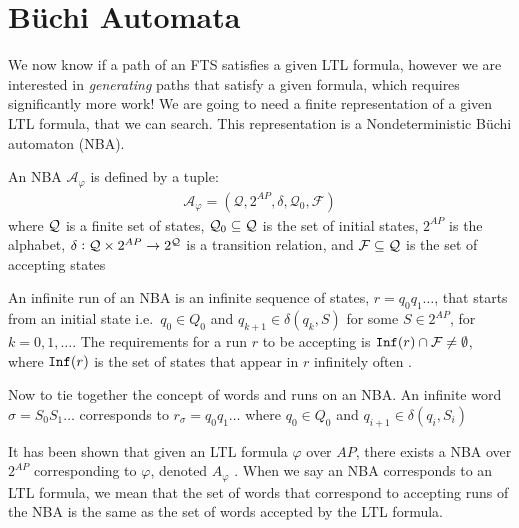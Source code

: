 \section{B\"{u}chi Automata}
We now know if a path of an FTS satisfies a given LTL formula, however we are interested in \textit{generating} paths that satisfy a given formula, which requires significantly more work! We are going to need a finite representation of a given LTL formula, that we can search. This representation is a Nondeterministic B\"{u}chi automaton (NBA). 
\begin{definition}
\label{defNBA}
An NBA $\mathcal{A}_\varphi$ is defined by a tuple:
\begin{align*}
\mathcal{A}_\varphi = (\mathcal{Q},2^{AP},\delta,\mathcal{Q}_0,\mathcal{F})
\end{align*}
where $\mathcal{Q}$ is a finite set of states, $\mathcal{Q}_0 \subseteq \mathcal{Q}$ is the set of initial states, $2^{AP}$ is the alphabet, $\delta: \mathcal{Q} \times 2^{AP} \rightarrow 2^{\mathcal{Q}}$ is a transition relation, and $\mathcal{F} \subseteq \mathcal{Q}$ is the set of accepting states
\end{definition} 
An infinite run of an NBA is an infinite sequence of states, $r=q_0 q_1 \dots$, that starts from an initial state i.e.\ $q_0 \in Q_0$ and $q_{k+1} \in \delta(q_k, S)$ for some $S \in 2^{AP}$, for $k = 0,1,\dots$. The requirements for a run $r$ to be accepting is $\texttt{Inf}(r) \cap \mathcal{F} \neq \emptyset$, where $\texttt{Inf}(r)$ is the set of states that appear in $r$ infinitely often \cite{guo15}. 

Now to tie together the concept of words and runs on an NBA. An infinite word $\sigma = S_0 S_1 \dots$ corresponds to $r_\sigma = q_0 q_1 \dots$ where $q_0 \in Q_0$ and $q_{i+1} \in \delta(q_i,S_i)$

It has been shown that given an LTL formula $\varphi$ over $AP$, there exists a NBA over $2^{AP}$ corresponding to $\varphi$, denoted $A_\varphi$ \cite{baier08}. When we say an NBA corresponds to an LTL formula, we mean that the set of words that correspond to accepting runs of the NBA is the same as the set of words accepted by the LTL formula.  

